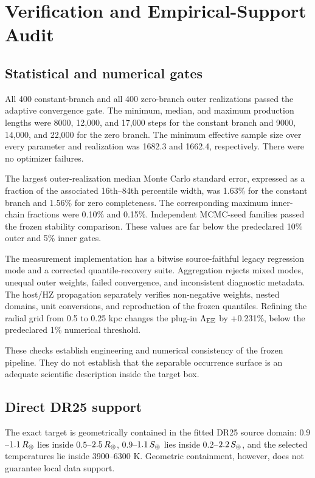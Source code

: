 \section{Verification and Empirical-Support Audit}\label{sec:verification}

\subsection{Statistical and numerical gates}

All 400 constant-branch and all 400 zero-branch outer realizations passed the
adaptive convergence gate. The minimum, median, and maximum production lengths
were 8000, 12,000, and 17,000 steps for the constant branch and 9000, 14,000,
and 22,000 for the zero branch. The minimum effective sample size over every
parameter and realization was 1682.3 and 1662.4, respectively. There were no
optimizer failures.

The largest outer-realization median Monte Carlo standard error, expressed as
a fraction of the associated 16th--84th percentile width, was 1.63\% for the
constant branch and 1.56\% for zero completeness. The corresponding maximum
inner-chain fractions were 0.10\% and 0.15\%. Independent MCMC-seed families
passed the frozen stability comparison. These values are far below the
predeclared 10\% outer and 5\% inner gates.

The measurement implementation has a bitwise source-faithful legacy regression
mode and a corrected quantile-recovery suite. Aggregation rejects mixed modes,
unequal outer weights, failed convergence, and inconsistent diagnostic
metadata. The host/HZ propagation separately verifies non-negative weights,
nested domains, unit conversions, and reproduction of the frozen quantiles.
Refining the radial grid from 0.5 to 0.25 kpc changes the plug-in $\Lambda_{\rm EE}$ by
+0.231\%, below the predeclared 1\% numerical threshold.

These checks establish engineering and numerical consistency of the frozen
pipeline. They do not establish that the separable occurrence surface is an
adequate scientific description inside the target box.

\subsection{Direct DR25 support}\label{subsec:dr25support}

The exact target is geometrically contained in the fitted DR25 source domain:
$0.9$--$1.1\,R_{\oplus}$ lies inside $0.5$--$2.5\,R_{\oplus}$,
$0.9$--$1.1\,S_{\oplus}$ lies inside $0.2$--$2.2\,S_{\oplus}$, and the selected
temperatures lie inside 3900--6300 K. Geometric containment, however, does not
guarantee local data support.


